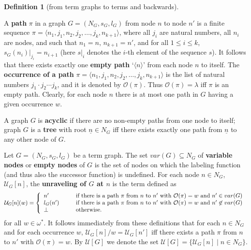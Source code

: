 \documentclass{eptcs}
\theoremstyle{plain}
\theoremstyle{definition}
\newtheorem{definition}[theorem]{Definition}
\newcommand{\varnodes}[1]{var(#1)}
\begin{document}
\begin{definition}
[from term graphs to terms and backwards]
\label{de:from term graphs to terms}

A {\bf path} $\pi$ in a graph
$G = (N_G, s_G, l_G)$ from node $n$ to node $n'$ is a finite sequence 
$\pi = \langle n_1, j_1, n_2, j_2, \ldots, j_k,  n_{k+1}\rangle$,
where all $j_i$ are natural numbers, all $n_i$ 
are nodes, and such that $n_1 = n$, $n_{k+1} = n'$, and for all $1 
\leq i 
\le k$, $s_G(n_i)|_{j_i} = 
n_{i+1}$ (here $s|_i$ denotes the $i$-th element of the
sequence $s$). It follows that there exists exactly one {\bf empty 
path} `$\langle n \rangle$' from each node $n$ to itself.
The {\bf occurrence of a path} $\pi =\langle n_1, j_1, n_2, 
j_2, \ldots, j_k,  n_{k+1}\rangle$ is the list of natural numbers 
$j_1\cdot j_2 \cdots j_k$, and it is denoted by $\mathcal{O}(\pi)$. Thus 
$\mathcal{O}(\pi) = \lambda$ iff $\pi$ is an empty path. Clearly, 
for each node $n$ there is at most one path in $G$ having a given 
occurrence $w$. 

A graph $G$ is
{\bf acyclic} if there are  no non-empty paths from one node to 
itself; graph $G$ is a {\bf tree} with root $\underline{n} \in N_G$ 
iff there
exists exactly one path from $\underline{n}$ to any other node of $G$.
  
Let $G = (N_G, s_G, l_G)$ be a term graph. The set $\varnodes{G} 
\subseteq N_G$ 
of {\bf variable
nodes\/} or {\bf empty nodes} of $G$ is the set of nodes on which the 
labeling function (and thus also the successor function) is undefined.
For each node $n\in N_G$, 
$\mathcal{U}_G[n]$, the {\bf unraveling of $G$ at $n$} is the term 
defined as
\[
\mathcal{U}_G[n](w)=
 \left\{
  \begin{array}{l@{\hspace{1cm}}p{10cm}}
n' & if there is a path $\pi$ from $n$ to $n'$ with 
$\mathcal{ O}(\pi) = w$ and $n' \in \varnodes{G}$\\
l_G(n')	& if there is a path $\pi$ from $n$ to $n'$ with 
$\mathcal{ O}(\pi) = w$ and $n' \not \in \varnodes{G}$\\
 \bot & otherwise.
 \end{array}
\right.
\]
for all $w\in\omega^*$. It follows immediately from these definitions 
that for each $n \in N_G$ and for each occurrence $w$, $\mathcal{U}_G[n] 
/ w = \mathcal{U}_G[n']$ iff there exists a path $\pi$ from $n$ to $n'$ 
with $\mathcal{O}(\pi) = w$. By $\mathcal{U}[G]$ we denote the set 
$\mathcal{U}[G]=\{\mathcal{U}_G[n] \mid n\in N_G\}$.



\end{definition}
\end{document}
